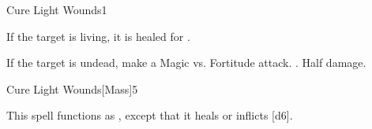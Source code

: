 \begin{spellsection}{Cure Light Wounds}{1}
\begin{spellheader}
\end{spellheader}
\begin{spellcontent}
    \begin{spelltargetinginfo}
    \end{spelltargetinginfo}
    \begin{spelleffects}
        \spelleffect If the target is living, it is healed for .
        \begin{spellattacktriggered}{If the target is undead, make a Magic vs. Fortitude attack.}
            \spellsuccess {}.
            \spellfailure Half damage.
        \end{spellattacktriggered}
    \end{spelleffects}
\end{spellcontent}
\begin{spellfooter}
\end{spellfooter}
\end{spellsection}

\begin{spellsection}{Cure Light Wounds}[Mass]{5}
\begin{spellheader}
\end{spellheader}
\begin{spellcontent}
    \begin{spelltargetinginfo}
    \end{spelltargetinginfo}
    \begin{spelleffects}
        \spellspecial This spell functions as , except that it heals or inflicts [d6].
    \end{spelleffects}
\end{spellcontent}
\begin{spellfooter}
\end{spellfooter}
\end{spellsection}

